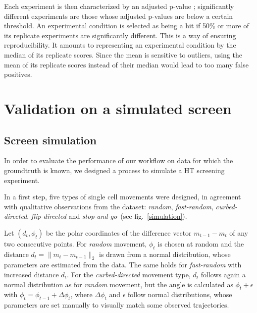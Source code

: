 Each experiment is then characterized by an adjusted p-value ; significantly different experiments are those whose adjusted p-values are below a certain threshold. An experimental condition is selected as being a hit if 50\% or more of its replicate experiments are significantly different. This is a way of ensuring reproducibility. It amounts to representing an experimental condition by the median of its replicate scores. Since the mean is sensitive to outliers, using the mean of its replicate scores instead of their median would lead to too many false positives.

\section{Validation on a simulated screen}
\label{sec:simulation}
\subsection{Screen simulation}
In order to evaluate the performance of our workflow on data for which the groundtruth is
known, we designed a process to simulate a HT screening
experiment. 

In a first step, five types of single cell movements were designed, in
agreement with qualitative observations from the dataset: \textit{random}, \textit{fast-random}, \textit{curbed-directed}, \textit{flip-directed} and \textit{stop-and-go}~(see fig.~\ref{simulation}). 


Let $(d_t,\phi_t)$ be the polar coordinates of the difference vector $m_{t-1}-m_t$
of any two consecutive
points. For \textit{random} movement, $\phi_t$ is
chosen at random and the distance $d_t=\|m_t-m_{t-1}\|_2$ is
drawn from a normal distribution, whose parameters are estimated from
the data. The same holds for \textit{fast-random} with increased
distance $d_t$. For the \textit{curbed-directed} movement type, $d_t$
follows again a normal distribution as for \textit{random} movement,
but the angle is calculated as $\phi_t + \epsilon$ with $\phi_t =
\phi_{t-1} + \Delta \phi_t$, where $\Delta \phi_t$ and $\epsilon$
follow normal distributions, whose parameters are set manually to
visually match some observed trajectories. 

